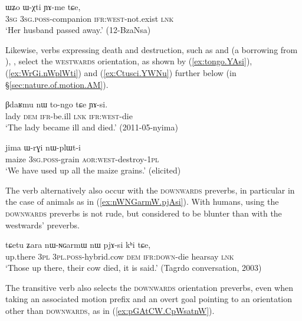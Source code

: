 \begin{exe}
\ex \label{ex:WXti.YAme}
\gll  ɯʑo ɯ-χti ɲɤ-me tɕe,  \\
\textsc{3sg} \textsc{3sg}.\textsc{poss}-companion \textsc{ifr}:\textsc{west}-not.exist \textsc{lnk} \\
\glt `Her husband passed away.' (12-BzaNsa) 
\end{exe} 

Likewise, verbs expressing death and destruction, such as  and  (a borrowing from ), ,  select the \textsc{westwards} orientation, as shown by (\ref{ex:tongo.YAsi}), (\ref{ex:WrGi.nWplWti}) and (\ref{ex:Ctusci.YWNu}) further below (in §\ref{sec:nature.of.motion.AM}).

 \begin{exe}
\ex \label{ex:tongo.YAsi}
\gll βdaʁmu nɯ to-ngo tɕe ɲɤ-si. \\
lady \textsc{dem} \textsc{ifr}-be.ill \textsc{lnk} \textsc{ifr}:\textsc{west}-die \\
\glt `The lady became ill and died.' (2011-05-nyima)
 \end{exe} 
 
  \begin{exe}
\ex \label{ex:WrGi.nWplWti}
\gll  jima ɯ-rɣi nɯ-plɯt-i \\
maize \textsc{3sg}.\textsc{poss}-grain \textsc{aor}:\textsc{west}-destroy-\textsc{1pl} \\
\glt `We have used up all the maize grains.' (elicited)
  \end{exe} 
  
 The verb  alternatively also occur with the \textsc{downwards} preverbs, in particular in the case of animals as in (\ref{ex:nWNGarmW.pjAsi}). With humans, using the \textsc{downwards} preverbs is not rude, but considered to be blunter than with the  westwards' preverbs.
 
\begin{exe}
\ex \label{ex:nWNGarmW.pjAsi}
\gll  tɕetu ʑara nɯ-ɴɢarmɯ nɯ pjɤ-si kʰi tɕe,  \\
up.there \textsc{3pl} \textsc{3pl}.\textsc{poss}-hybrid.cow \textsc{dem} \textsc{ifr}:\textsc{down}-die hearsay \textsc{lnk} \\
\glt `Those up there, their cow died, it is said.' (Tagrdo conversation, 2003)
   \end{exe} 
   
The transitive verb  also selects the \textsc{downwards} orientation preverbs, even when taking an associated motion prefix and an overt goal pointing to an orientation other than \textsc{downwards}, as in (\ref{ex:pGAtCW.CpWsatnW}).

